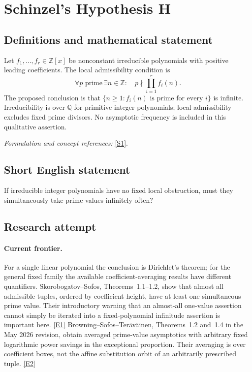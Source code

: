 \documentclass[11pt]{article}
\newcommand{\Z}{\mathbb{Z}}
\newcommand{\Q}{\mathbb{Q}}
\newcommand{\sref}[2]{\hyperlink{source:#1:#2}{[S#2]}}
\newcommand{\eref}[2]{\hyperlink{extra:#1:#2}{[E#2]}}
\newif\ifshowcatalogue
\newcommand{\cataloguescope}[1]{\ifshowcatalogue
 \paragraph{Exact scope in the supplied catalogue.}
 \begin{quote}\small #1\end{quote}\fi}
\begin{document}
\setcounter{section}{0}
\clearpage
\section*{\texorpdfstring{Schinzel's Hypothesis H}{Schinzel's Hypothesis H}}\label{1179}
\subsection{Definitions and mathematical statement}
Let $f_1,\ldots,f_r\in\Z[x]$ be nonconstant irreducible polynomials with positive leading coefficients. The local admissibility condition is
\[
 \forall p\text{ prime}\ \exists n\in\Z:\quad p\nmid\prod_{i=1}^r f_i(n).
\]
The proposed conclusion is that $\{n\ge1:f_i(n)\text{ is prime for every }i\}$ is infinite. Irreducibility is over $\Q$ for primitive integer polynomials; local admissibility excludes fixed prime divisors. No asymptotic frequency is included in this qualitative assertion.
\par\smallskip\textit{Formulation and concept references:} \sref{1179}{1}.
\cataloguescope{Let f1,...,fr in Z[x] be irreducible with positive leading coefficients and no prime dividing f1(n)...fr(n) for every n. Prove that infinitely many positive integers n make every fi(n) prime.}
\subsection{Short English statement}
If irreducible integer polynomials have no fixed local obstruction, must they simultaneously take prime values infinitely often?
\subsection{Research attempt}

\paragraph{Current frontier.}
For a single linear polynomial the conclusion is Dirichlet's theorem;
for the general fixed family the available coefficient-averaging results
have different quantifiers. Skorobogatov--Sofos, Theorems~1.1--1.2,
show that almost all admissible tuples, ordered by coefficient height,
have at least one simultaneous prime value. Their introductory warning
that an almost-all one-value assertion cannot simply be iterated into a
fixed-polynomial infinitude assertion is important here. \eref{1179}{1}
Browning--Sofos--Ter\"av\"ainen, Theorems~1.2 and~1.4 in the May 2026
revision, obtain averaged prime-value asymptotics with arbitrary fixed
logarithmic power savings in the exceptional proportion. Their averaging
is over coefficient boxes, not the affine substitution orbit of an
arbitrarily prescribed tuple. \eref{1179}{2}
\end{document}
